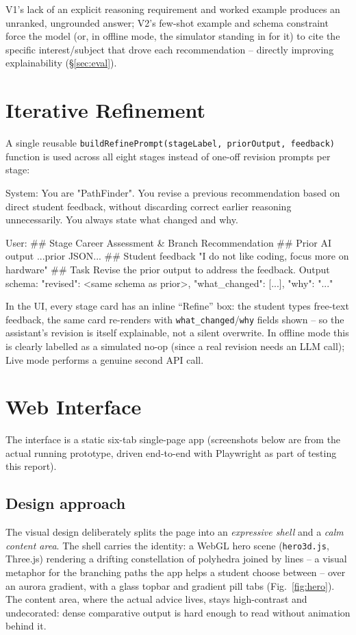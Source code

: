 \documentclass[11pt]{article}
\begin{document}
V1's lack of an explicit reasoning requirement and worked example produces an unranked, ungrounded answer; V2's few-shot example and schema constraint force the model (or, in offline mode, the simulator standing in for it) to cite the specific interest/subject that drove each recommendation -- directly improving explainability (\S\ref{sec:eval}).

\section{Iterative Refinement}
\label{sec:refine}

A single reusable \texttt{buildRefinePrompt(stageLabel, priorOutput, feedback)} function is used across all eight stages instead of one-off revision prompts per stage:

\begin{code}
System: You are "PathFinder". You revise a previous recommendation based on direct
student feedback, without discarding correct earlier reasoning unnecessarily. You
always state what changed and why.

User:
## Stage
Career Assessment & Branch Recommendation
## Prior AI output
{ ...prior JSON... }
## Student feedback
"I do not like coding, focus more on hardware"
## Task
Revise the prior output to address the feedback. Output schema:
{"revised": <same schema as prior>, "what_changed": [...], "why": "..."}
\end{code}

In the UI, every stage card has an inline ``Refine'' box: the student types free-text feedback, the same card re-renders with \texttt{what\_changed}/\texttt{why} fields shown -- so the assistant's revision is itself explainable, not a silent overwrite. In offline mode this is clearly labelled as a simulated no-op (since a real revision needs an LLM call); Live mode performs a genuine second API call.

\section{Web Interface}
\label{sec:ui}

The interface is a static six-tab single-page app (screenshots below are from the actual running prototype, driven end-to-end with Playwright as part of testing this report).

\subsection{Design approach}
The visual design deliberately splits the page into an \emph{expressive shell} and a \emph{calm content area}. The shell carries the identity: a WebGL hero scene (\texttt{hero3d.js}, Three.js) rendering a drifting constellation of polyhedra joined by lines -- a visual metaphor for the branching paths the app helps a student choose between -- over an aurora gradient, with a glass topbar and gradient pill tabs (Fig.~\ref{fig:hero}). The content area, where the actual advice lives, stays high-contrast and undecorated: dense comparative output is hard enough to read without animation behind it.
\end{document}
